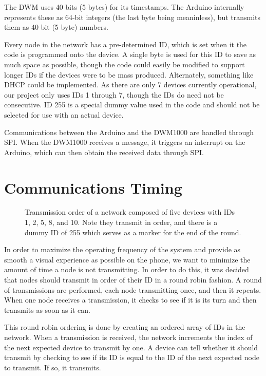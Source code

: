 The DWM uses 40 bits (5 bytes) for its timestamps. The Arduino internally represents these as 64-bit integers (the last byte being meaninless), but transmits them as 40 bit (5 byte) numbers.

Every node in the network has a pre-determined ID, which is set when it the code is programmed onto the device. A single byte is used for this ID to save as much space as possible, though the code could easily be modified to support longer IDs if the devices were to be mass produced. Alternately, something like DHCP could be implemented. As there are only 7 devices currently operational, our project only uses IDs 1 through 7, though the IDs do need not be consecutive. ID 255 is a special dummy value used in the code and should not be selected for use with an actual device.

Communications between the Arduino and the DWM1000 are handled through SPI. When the DWM1000 receives a message, it triggers an interrupt on the Arduino, which can then obtain the received data through SPI.

\section{Communications Timing}

\begin{figure}
	\centering
	
	\decoRule
	\caption{Transmission order of a network composed of five devices with IDs 1, 2, 5, 8, and 10. Note they transmit in order, and there is a dummy ID of 255 which serves as a marker for the end of the round.}
	\label{fig:TransmissionOrder}
\end{figure}

In order to maximize the operating frequency of the system and provide as smooth a visual experience as possible on the phone, we want to minimize the amount of time a node is not transmitting. In order to do this, it was decided that nodes should transmit in order of their ID in a round robin fashion. A round of transmissions are performed, each node transmitting once, and then it repeats. When one node receives a transmission, it checks to see if it is its turn and then transmits as soon as it can.

This round robin ordering is done by creating an ordered array of IDs in the network. When a transmission is received, the network increments the index of the next expected device to transmit by one. A device can tell whether it should transmit by checking to see if its ID is equal to the ID of the next expected node to transmit. If so, it transmits. 

